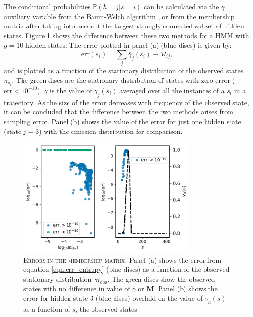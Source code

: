 The conditional probabilities $\mathbb{P}(h=j|s=i)$ can be calculated via the $\gamma$ auxiliary variable from the Baum-Welch algorithm \cite{baumMaximizationTechniqueOccurring1970, welch2003hidden}, or from the membership matrix after taking into account the largest strongly connected subset of hidden states.  Figure \ref{fig:membership_error} shows the difference between these two methods for a HMM with $g=10$ hidden states.  The error plotted in panel (a) (blue discs) is given by:
\begin{equation}\label{eqn:err_entropy}
\mathrm{err}(s_{i}) = \sum_j\bar{\gamma}_{j}(s_{i}) - M_{ij}, 
\end{equation}
and is plotted as a function of the stationary distribution of the observed states $\pi_{s_{i}}$. The green discs are the stationary distribution of states with zero error ($\mathrm{err}<10^{-10}$). $\bar{\gamma}$ is the value of $\gamma_{j}(s_{i})$ averaged over all the instances of a $s_{i}$ in a trajectory. As the size of the error decreases with frequency of the observed state, it can be concluded that the difference between the two methods arises from sampling error. Panel (b) shows the value of the error for just one hidden state (state $j=3$) with the emission distribution for comparison. 
\begin{figure}
    \centering
    \includegraphics[width=0.8\textwidth]{chapters/hmm_selection/figures/entropy_error_explanation.png}
    \caption[Errors in the membership matrix]{\textsc{Errors in the membership matrix}. Panel (a) shows the error from equation \ref{eqn:err_entropy} (blue discs) as a function of the observed stationary distribution, $\bm{\pi}_{\mathrm{obs}}$. The green discs show the observed states with no difference in value of $\gamma$ or $\mathbf{M}$. Panel (b) shows the error for hidden state $3$ (blue discs) overlaid on the value of $\gamma_{3}(s)$ as a function of $s$, the observed states.}
    \label{fig:membership_error}
\end{figure}

